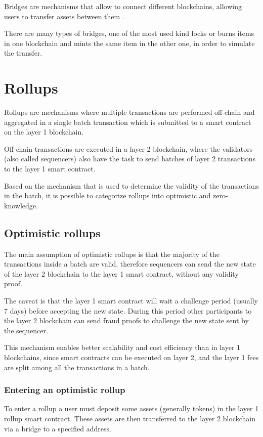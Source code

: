 \documentclass[11pt]{article}
\begin{document}
Bridges are mechanisms that allow to connect different blockchains, allowing users to transfer assets between them \cite{ethereum_bridges}.

There are many types of bridges, one of the most used kind locks or burns items in one blockchain and mints the same item in the other one, in order to simulate the transfer.

\section{Rollups} \label{section:rollups}
Rollups are mechanisms where multiple transactions are performed off-chain and aggregated in a single batch transaction which is submitted to a smart contract on the layer 1 blockchain.

Off-chain transactions are executed in a layer 2 blockchain, where the validators (also called sequencers) also have the task to send batches of layer 2 transactions to the layer 1 smart contract.

Based on the mechanism that is used to determine the validity of the transactions in the batch, it is possible to categorize rollups into optimistic and zero-knowledge.

\subsection{Optimistic rollups} \label{subsection:optimistic_rollups}
The main assumption of optimistic rollups is that the majority of the transactions inside a batch are valid, therefore sequencers can send the new state of the layer 2 blockchain to the layer 1 smart contract, without any validity proof.

The caveat is that the layer 1 smart contract will wait a challenge period (usually 7 days) before accepting the new state. 
During this period other participants to the layer 2 blockchain can send fraud proofs to challenge the new state sent by the sequencer.

This mechanism enables better scalability and cost efficiency than in layer 1 blockchains, since smart contracts can be executed on layer 2, and the layer 1 fees are split among all the transactions in a batch.

\subsubsection{Entering an optimistic rollup} \label{subsubsection:entering_optimistic_rollup}
To enter a rollup a user must deposit some assets (generally tokens) in the layer 1 rollup smart contract. These assets are then transferred to the layer 2 blockchain via a bridge to a specified address.
\end{document}
